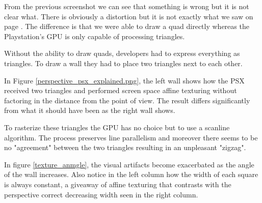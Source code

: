 From the previous screenshot we can see that something is wrong but it is not clear what. There is obviously a distortion but it is not exactly what we saw on page \pageref{affine_texture_examples}. The difference is that we were able to draw a quad directly whereas the Playstation's GPU is only capable of processing triangles.\\
\par
 Without the ability to  draw quads, developers had to express everything as triangles. To draw a wall they had to place two triangles next to each other.\\
\par
{}
\par
In Figure \ref{perspective_psx_explained.png}, the left wall shows how the PSX received two triangles and performed screen space affine texturing without factoring in the distance from the point of view. The result differs significantly from what it should have been as the right wall shows.\\
\par
 To rasterize these triangles the GPU has no choice but to use a scanline algorithm. The process preserves line parallelism and moreover there seems to be no "agreement" between the two triangles resulting in an unpleasant "zigzag".\\
\par
In figure \ref{texture_anmgle}, the visual artifacts become exacerbated as the angle of the wall increases. Also notice in the left column how the width of each square is always constant, a giveaway of affine texturing that contrasts with the perspective correct decreasing width seen in the right column.\\ 
\pagebreak




